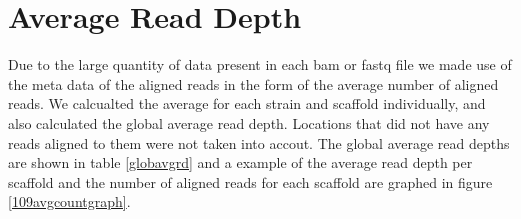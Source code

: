 \documentclass[12pt]{article}
\begin{document}
\section{Average Read Depth}
	Due to the large quantity of data present in each bam or fastq file we made use of the meta data of the aligned reads in the form of the average number of aligned reads. We calcualted the average for each strain and scaffold individually, and also calculated the global average read depth. Locations that did not have any reads aligned to them were not taken into accout. The global average read depths are shown in table \ref{globavgrd} and a example of the average read depth per scaffold and the number of aligned reads for each scaffold are graphed in figure \ref{109avgcountgraph}.
\begin{table}[H]
	\begin{center}
		 \label{globavgrd}
		\vspace{0.5cm}
	\end{center}
\end{table}
\end{document}
